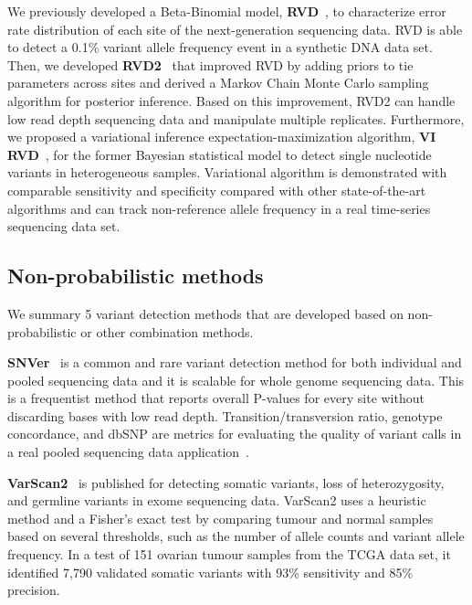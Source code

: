 \documentclass[a4,center,fleqn]{NAR}
\begin{document}
We previously developed a Beta-Binomial model, \textbf{RVD}~\citep{Flaherty2012}, to characterize error rate distribution of each site of the next-generation sequencing data.
RVD is able to detect a 0.1\% variant allele frequency event in a synthetic DNA data set.
Then, we developed \textbf{RVD2}~\citep{He2015} that improved RVD by adding priors to tie parameters across sites and derived a Markov Chain Monte Carlo sampling algorithm for posterior inference.
Based on this improvement, RVD2 can handle low read depth sequencing data and manipulate multiple replicates.
Furthermore, we proposed a variational inference expectation-maximization algorithm, \textbf{VI RVD}~\citep{zhang2016variational}, for the former Bayesian statistical model to detect single nucleotide variants in heterogeneous samples.
Variational algorithm is demonstrated with comparable sensitivity and specificity compared with other state-of-the-art algorithms and can track non-reference allele frequency in a real time-series sequencing data set.


\subsection{Non-probabilistic methods}

We summary 5 variant detection methods that are developed based on non-probabilistic or other combination methods.

\textbf{SNVer}~\citep{Wei2011} is a common and rare variant detection method for both individual and pooled sequencing data and it is scalable for whole genome sequencing data.
This is a frequentist method that reports overall P-values for every site without discarding bases with low read depth.
Transition/transversion ratio, genotype concordance, and dbSNP are metrics for evaluating the quality of variant calls in a real pooled sequencing data application~\citep{depristo2011framework}.

\textbf{VarScan2}~\citep{Koboldt2012} is published for detecting somatic variants, loss of heterozygosity, and germline variants in exome sequencing data.
VarScan2 uses a heuristic method and a Fisher's exact test by comparing tumour and normal samples based on several thresholds, such as the number of allele counts and variant allele frequency.
In a test of 151 ovarian tumour samples from the TCGA data set, it identified 7,790 validated somatic variants with 93\% sensitivity and 85\% precision.
\end{document}
